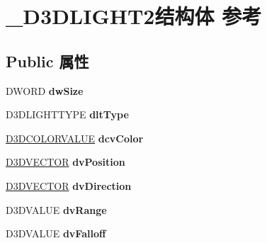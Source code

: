 \hypertarget{struct___d3_d_l_i_g_h_t2}{}\section{\+\_\+\+D3\+D\+L\+I\+G\+H\+T2结构体 参考}
\label{struct___d3_d_l_i_g_h_t2}
\subsection*{Public 属性}
\begin{DoxyCompactItemize}
\item 
\mbox{\label{struct___d3_d_l_i_g_h_t2_a44e6831502351e437f4eb2e5e6cddab8}} 
D\+W\+O\+RD {\bfseries dw\+Size}
\item 
\mbox{\label{struct___d3_d_l_i_g_h_t2_a7995e06e85d8a55f13c364b978592af7}} 
D3\+D\+L\+I\+G\+H\+T\+T\+Y\+PE {\bfseries dlt\+Type}
\item 
\mbox{\label{struct___d3_d_l_i_g_h_t2_a3da112f1c1858846c4a8d7409f7476dc}} 
\hyperlink{struct___d3_d_c_o_l_o_r_v_a_l_u_e}{D3\+D\+C\+O\+L\+O\+R\+V\+A\+L\+UE} {\bfseries dcv\+Color}
\item 
\mbox{\label{struct___d3_d_l_i_g_h_t2_a2eb547678c5b25378d5fa0a337bdb81f}} 
\hyperlink{struct___d3_d_v_e_c_t_o_r}{D3\+D\+V\+E\+C\+T\+OR} {\bfseries dv\+Position}
\item 
\mbox{\label{struct___d3_d_l_i_g_h_t2_a5b6993baf8cdaa078151e3c0c4c84f9e}} 
\hyperlink{struct___d3_d_v_e_c_t_o_r}{D3\+D\+V\+E\+C\+T\+OR} {\bfseries dv\+Direction}
\item 
\mbox{\label{struct___d3_d_l_i_g_h_t2_ab8f50da608d292085ac623a850b33d07}} 
D3\+D\+V\+A\+L\+UE {\bfseries dv\+Range}
\item 
\mbox{\label{struct___d3_d_l_i_g_h_t2_a6f61640229c91b90b9dfccd081e80638}} 
D3\+D\+V\+A\+L\+UE {\bfseries dv\+Falloff}
\item 
\mbox{\label{struct___d3_d_l_i_g_h_t2_a55ce707ae5d038e09e2e96c9ed9cf5ce}} 

\end{DoxyCompactItemize}
